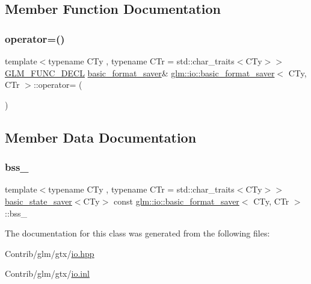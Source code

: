\subsection{Member Function Documentation}
\mbox{\label{classglm_1_1io_1_1basic__format__saver_a3d4f0a9fd357a611f81b17443cf5276b}} 
\subsubsection{\texorpdfstring{operator=()}{operator=()}}
{\footnotesize\ttfamily template$<$typename C\+Ty , typename C\+Tr  = std\+::char\+\_\+traits$<$\+C\+Ty$>$$>$ \\
\mbox{\hyperlink{setup_8hpp_ab2d052de21a70539923e9bcbf6e83a51}{G\+L\+M\+\_\+\+F\+U\+N\+C\+\_\+\+D\+E\+CL}} \mbox{\hyperlink{classglm_1_1io_1_1basic__format__saver}{basic\+\_\+format\+\_\+saver}}\& \mbox{\hyperlink{classglm_1_1io_1_1basic__format__saver}{glm\+::io\+::basic\+\_\+format\+\_\+saver}}$<$ C\+Ty, C\+Tr $>$\+::operator= (\begin{DoxyParamCaption}\item[{\mbox{\hyperlink{classglm_1_1io_1_1basic__format__saver}{basic\+\_\+format\+\_\+saver}}$<$ C\+Ty, C\+Tr $>$ const \&}]{ }\end{DoxyParamCaption})\hspace{0.3cm}{\ttfamily [private]}}



\subsection{Member Data Documentation}
\mbox{\label{classglm_1_1io_1_1basic__format__saver_a5d2b333a0879f294698c266fa4a7792b}} 
\subsubsection{\texorpdfstring{bss\+\_\+}{bss\_}}
{\footnotesize\ttfamily template$<$typename C\+Ty , typename C\+Tr  = std\+::char\+\_\+traits$<$\+C\+Ty$>$$>$ \\
\mbox{\hyperlink{classglm_1_1io_1_1basic__state__saver}{basic\+\_\+state\+\_\+saver}}$<$C\+Ty$>$ const \mbox{\hyperlink{classglm_1_1io_1_1basic__format__saver}{glm\+::io\+::basic\+\_\+format\+\_\+saver}}$<$ C\+Ty, C\+Tr $>$\+::bss\+\_\+\hspace{0.3cm}{\ttfamily [private]}}



The documentation for this class was generated from the following files\+:\begin{DoxyCompactItemize}
\item 
Contrib/glm/gtx/\mbox{\hyperlink{io_8hpp}{io.\+hpp}}\item 
Contrib/glm/gtx/\mbox{\hyperlink{io_8inl}{io.\+inl}}\end{DoxyCompactItemize}
